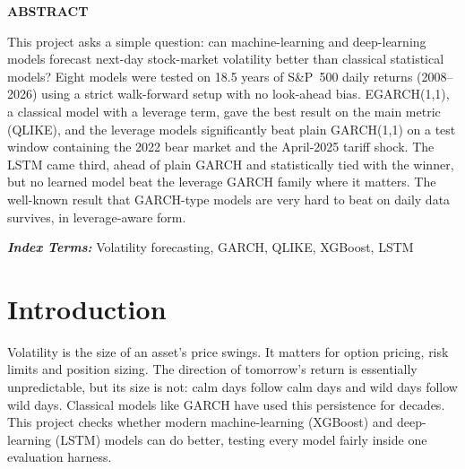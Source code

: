 \documentclass[a4paper,twocolumn,10pt]{article}
\begin{document}

\begin{center}\textbf{ABSTRACT}\end{center}
\noindent
This project asks a simple question: can machine-learning and deep-learning models forecast next-day stock-market volatility better than classical statistical models? Eight models were tested on 18.5 years of S\&P~500 daily returns (2008--2026) using a strict walk-forward setup with no look-ahead bias. EGARCH(1,1), a classical model with a leverage term, gave the best result on the main metric (QLIKE), and the leverage models significantly beat plain GARCH(1,1) on a test window containing the 2022 bear market and the April-2025 tariff shock. The LSTM came third, ahead of plain GARCH and statistically tied with the winner, but no learned model beat the leverage GARCH family where it matters. The well-known result that GARCH-type models are very hard to beat on daily data survives, in leverage-aware form.

\vspace{2mm}
\noindent\textbf{\textit{Index Terms:}} Volatility forecasting, GARCH, QLIKE, XGBoost, LSTM

\section{Introduction}
Volatility is the size of an asset's price swings. It matters for option pricing, risk limits and position sizing. The direction of tomorrow's return is essentially unpredictable, but its size is not: calm days follow calm days and wild days follow wild days. Classical models like GARCH have used this persistence for decades. This project checks whether modern machine-learning (XGBoost) and deep-learning (LSTM) models can do better, testing every model fairly inside one evaluation harness.
\end{document}
